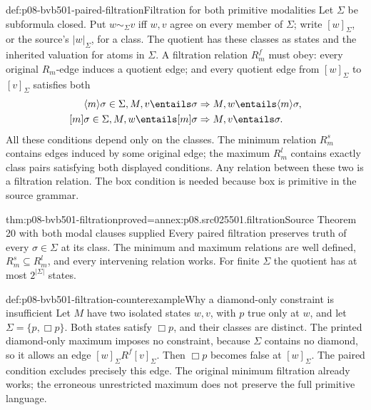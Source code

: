 \begin{hbdefinition}{def:p08-bvb501-paired-filtration}{Filtration for both primitive modalities}
Let \(\Sigma\) be subformula closed. Put \(w\sim_\Sigma v\)
iff \(w,v\) agree on every member of \(\Sigma\); write
\([w]_\Sigma\), or the source's \(|w|_\Sigma\), for a class.
The quotient has these classes as states and the inherited valuation for
atoms in \(\Sigma\). A filtration relation \(R_m^f\) must obey:
every original \(R_m\)-edge induces a quotient edge; and every quotient
edge from \([w]_\Sigma\) to \([v]_\Sigma\) satisfies both
\[
 \begin{aligned}
 \langle m\rangle\sigma\in\Sigma, M,v\entails\sigma
     &\Rightarrow M,w\entails\langle m\rangle\sigma,\\
 [m]\sigma\in\Sigma, M,w\entails[m]\sigma
     &\Rightarrow M,v\entails\sigma.
 \end{aligned}
\]
All these conditions depend only on the classes. The minimum relation
\(R_m^s\) contains edges induced by some original edge; the maximum
\(R_m^l\) contains exactly class pairs satisfying both displayed
conditions. Any relation between these two is a filtration relation.
The box condition is needed because box is primitive in the source grammar.
\end{hbdefinition}

\begin{hbtheorem}{thm:p08-bvb501-filtration}{proved=annex:p08.src025501.filtration}{Source Theorem 20 with both modal clauses supplied}
Every paired filtration preserves truth of every \(\sigma\in\Sigma\)
at its class. The minimum and maximum relations are well defined,
\(R_m^s\subseteq R_m^l\), and every intervening relation works.
For finite \(\Sigma\) the quotient has at most \(2^{|\Sigma|}\)
states.
\end{hbtheorem}

\begin{hbexample}{def:p08-bvb501-filtration-counterexample}{Why a diamond-only constraint is insufficient}
Let \(M\) have two isolated states \(w,v\), with \(p\) true
only at \(w\), and let \(\Sigma=\{p,\Box p\}\).
Both states satisfy \(\Box p\), and their classes are distinct.
The printed diamond-only maximum imposes no constraint, because
\(\Sigma\) contains no diamond, so it allows an edge
\([w]_\Sigma R^f[v]_\Sigma\). Then \(\Box p\) becomes
false at \([w]_\Sigma\). The paired condition excludes precisely
this edge. The original minimum filtration already works; the erroneous
unrestricted maximum does not preserve the full primitive language.
\end{hbexample}

